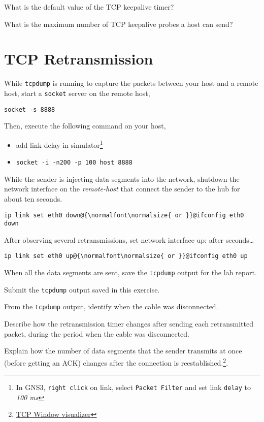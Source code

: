 \documentclass{../UTNetLab}
\begin{document}
    \begin{report}
    \item What is the default value of the TCP keepalive timer?
    
    \item What is the maximum number of TCP keepalive probes a host can send?
    \end{report}

\section{TCP Retransmission}
    While \lstinline{tcpdump} is running to capture the packets between your host and a remote host, start a \lstinline{socket} server on the remote host,
    \begin{lstlisting}
socket -s 8888
    \end{lstlisting}
    Then, execute the following command on your host,
    \begin{itemize}
        \item add link delay in simulator\footnote{In GNS3, \lstinline{right click} on link, select \lstinline{Packet Filter} and set link \lstinline{delay} to \textit{100 ms}}
        \item \lstinline[emph={host}]{socket -i -n200 -p 100 host 8888}
    \end{itemize}
    While the sender is injecting data segments into the network, shutdown the network interface on the \textit{remote-host} that connect the sender to the hub for about ten seconds.
    \begin{lstlisting}
ip link set eth0 down@{\normalfont\normalsize{ or }}@ifconfig eth0 down
    \end{lstlisting}

    After observing several retransmissions, set network interface up:
after seconds\ldots
    \begin{lstlisting}
ip link set eth0 up@{\normalfont\normalsize{ or }}@ifconfig eth0 up
    \end{lstlisting} %
    When all the data segments are sent, save the \lstinline{tcpdump} output for the lab report.
    
    \begin{report}
    \item Submit the \lstinline{tcpdump} output saved in this exercise.
    
    \item From the \lstinline{tcpdump} output, identify when the cable was disconnected.
    
    \item Describe how the retransmission timer changes after sending each retransmitted packet, during the period when the cable was disconnected.
    
    \item Explain how the number of data segments that the sender transmits at once (before getting an ACK) changes after the connection is reestablished.\footnote{\href{http://www.ccs-labs.org/teaching/rn/animations/gbn_sr/}{TCP Window visualizer}}.
    \end{report}
    
\end{document}
